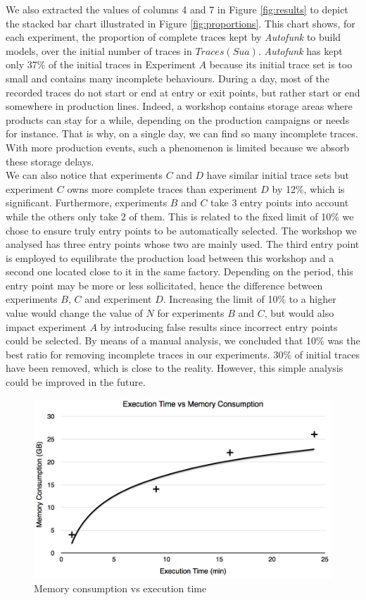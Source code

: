 We also extracted the values of columns 4 and 7 in Figure
\ref{fig:results} to depict the stacked bar chart illustrated in
Figure \ref{fig:proportions}. This chart shows, for each experiment, the
proportion of complete traces kept by \textit{Autofunk} to build
models, over the initial number of traces in $Traces(Sua)$.
\textit{Autofunk} has kept only 37\% of the initial traces in
Experiment $A$ because its initial trace set is too small and
contains many incomplete behaviours. During a day, most of the
recorded traces do not start or end at entry or exit points, but
rather start or end somewhere in production lines. Indeed,
a workshop contains storage areas where products can stay
for a while, depending on the production campaigns or needs for
instance. That is why, on a single day, we can find so many
incomplete traces. With more production events, such a phenomenon
is limited because we absorb these storage delays.\\
We can also notice that experiments $C$ and $D$ have similar
initial trace sets but experiment $C$ owns more complete traces
than experiment $D$ by 12\%, which is significant. Furthermore, experiments
$B$ and $C$ take 3 entry points into account while the others only
take 2 of them. This is related to the fixed limit of 10\% we
chose to ensure truly entry points to be automatically selected.
The workshop we analysed has three entry points whose two are
mainly used. The third entry point is employed to equilibrate the
production load between this workshop and a second one located
close to it in the same factory. Depending on the period, this
entry point may be more or less sollicitated, hence the
difference between experiments $B$, $C$ and experiment $D$.
Increasing the limit of 10\% to a higher value would change the value
of $N$ for experiments $B$ and $C$, but would also impact
experiment $A$ by introducing false results since incorrect entry
points could be selected. By means of a manual analysis, we
concluded that 10\% was the best ratio for removing incomplete
traces in our experiments. 30\% of initial traces have been
removed, which is close to the reality. However, this simple
analysis could be improved in the future.

\begin{figure}[H]
    \begin{center}
        \includegraphics[width=0.8\linewidth]{figures/memory-time.png}
    \end{center}

    \caption{Memory consumption vs execution time}
    \label{fig:memory-time}
\end{figure}

